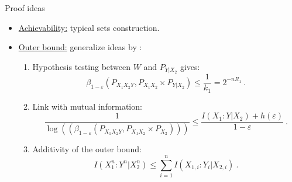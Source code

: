\documentclass{beamer}
\theoremstyle{definition}
\theoremstyle{remark}
\begin{document}
\begin{frame}{Proof ideas}
  \begin{itemize}
  \item \underline{Achievability:} typical sets construction.
    \pause
    \bigskip
  \item \underline{Outer bound:} generalize ideas by \cite{Matthews12,PPV10}:
    \pause
    \begin{enumerate}
    \item Hypothesis testing between $W$ and $P_{Y|X_2}$ gives:
      \[ \beta_{1-\varepsilon}\left(P_{X_1X_2Y},P_{X_1X_2} \times P_{Y|X_2}\right) \leq \frac{1}{k_1} = 2^{-nR_1} \ .\]
      \pause
    \item Link with mutual information:
      \[ \frac{1}{\log\left(\left(\beta_{1-\varepsilon}\left(P_{X_1X_2Y},P_{X_1X_2} \times P_{X_2}\right)\right)\right)} \leq \frac{I(X_1:Y|X_2) + h(\varepsilon)}{1-\varepsilon} \ .\]
      \pause
    \item Additivity of the outer bound:
      \[ I(X_1^n:Y^n|X_2^n) \leq \sum_{i=1}^n I(X_{1,i}:Y_i|X_{2,i}) \ .\]
    \end{enumerate}
  \end{itemize}
\end{frame}
\end{document}

